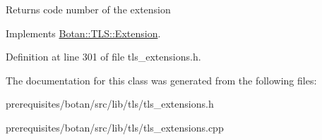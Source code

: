 \begin{DoxyReturn}{Returns}
code number of the extension 
\end{DoxyReturn}


Implements \mbox{\hyperlink{class_botan_1_1_t_l_s_1_1_extension_ac8819b312ce604453225e7b4f7c373ec}{Botan\+::\+T\+L\+S\+::\+Extension}}.



Definition at line 301 of file tls\+\_\+extensions.\+h.



The documentation for this class was generated from the following files\+:\begin{DoxyCompactItemize}
\item 
prerequisites/botan/src/lib/tls/tls\+\_\+extensions.\+h\item 
prerequisites/botan/src/lib/tls/tls\+\_\+extensions.\+cpp\end{DoxyCompactItemize}
